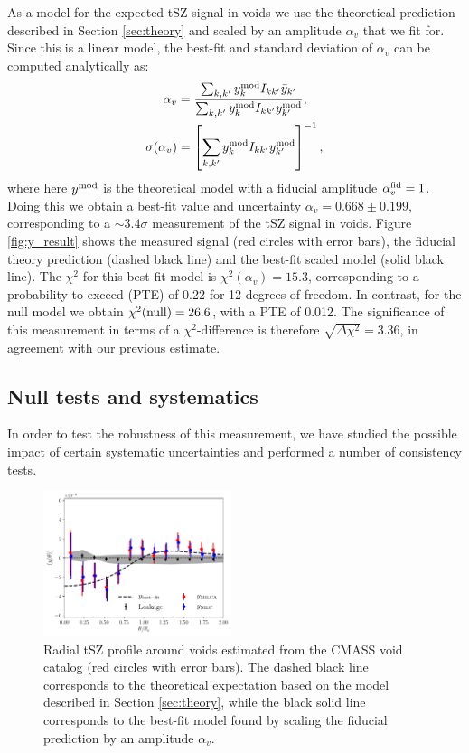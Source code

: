 \documentclass[twocolumn,amsfont,amssymb,amsmath, showpacs,balancelastpage, nofootinbib]{revtex4-1}
\begin{document}
      As a model for the expected tSZ signal in voids we use the theoretical prediction
      described in Section \ref{sec:theory} and scaled by an amplitude $\alpha_v$ that
      we fit for. Since this is a linear model, the best-fit and standard deviation of
      $\alpha_v$ can be computed analytically as:
      \begin{align}
        \alpha_v&=\frac{\sum_{k,k'}y_k^{\rm mod}I_{kk'}\bar{y}_{k'}}
                            {\sum_{k,k'}y_k^{\rm mod}I_{kk'}y^{\rm mod}_{k'}},\\
        \sigma(\alpha_v)&=\left[\sum_{k,k'}y_k^{\rm mod}I_{kk'}y^{\rm mod}_{k'}\right]^{-1},
      \end{align}
      where here $y^{\rm mod}$ is the theoretical model with a fiducial amplitude
      $\alpha_v^{\rm fid}=1$. Doing this we obtain a best-fit value and uncertainty
      $\alpha_v=0.668\pm0.199$, corresponding to a $\sim3.4\sigma$ measurement of
      the tSZ signal in voids. Figure \ref{fig:y_result} shows the measured signal (red
      circles with error bars), the fiducial theory prediction (dashed black line) and the
      best-fit scaled model (solid black line). The $\chi^2$ for this best-fit model is
      $\chi^2(\alpha_v)=15.3$, corresponding to a probability-to-exceed (PTE) of
      0.22 for 12 degrees of freedom. In contrast, for the null model we obtain 
      $\chi^2({\rm null})=26.6$, with a PTE of 0.012. The significance of this measurement
      in terms of a $\chi^2$-difference is therefore $\sqrt{\Delta\chi^2}=3.36$, in
      agreement with our previous estimate.
      
    \subsection{Null tests and systematics}\label{ssec:results.syst}
      In order to test the robustness of this measurement, we have studied the possible
      impact of certain systematic uncertainties and performed a number of consistency tests.
      \begin{figure}
        \centering
        \includegraphics[width=0.49\textwidth]{y_syst}
        \caption{Radial tSZ profile around voids estimated from the CMASS void catalog
                 (red circles with error bars). The dashed black line corresponds to
                 the theoretical expectation based on the model described in Section
                 \ref{sec:theory}, while the black solid line corresponds to the
                 best-fit model found by scaling the fiducial prediction by an
                 amplitude $\alpha_v$.}
        \label{fig:y_syst}
      \end{figure}
      
\end{document}

